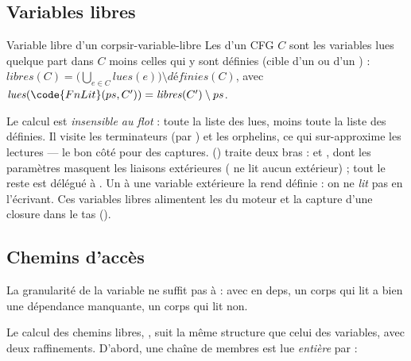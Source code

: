 \subsection{Variables libres}

\begin{definition}{Variable libre d'un corps}{ir-variable-libre}
Les  d'un CFG $C$ sont les variables lues quelque part dans $C$ moins celles qui y sont définies (cible d'un  ou d'un ) : $\mathit{libres}(C) = \bigl(\bigcup_{e \in C} \mathit{lues}(e)\bigr) \setminus \mathit{définies}(C)$, avec $\mathit{lues}(\code{FnLit}(ps, C')) = \mathit{libres}(C') \setminus ps$.
\end{definition}


Le calcul est \emph{insensible au flot} : toute la liste des lues, moins toute la liste des définies. Il visite les terminateurs (par ) et les orphelins, ce qui sur-approxime les lectures --- le bon côté pour des captures.  () traite deux bras :  et , dont les paramètres masquent les liaisons extérieures ( ne lit aucun  extérieur) ; tout le reste est délégué à . Un  à une variable extérieure la rend \og définie\fg{} : on ne \emph{lit} pas  en l'écrivant. Ces variables libres alimentent les  du moteur et la capture d'une closure dans le tas ().

\subsection{Chemins d'accès}

La granularité de la variable ne suffit pas à  : avec \code{[x.b]} en deps, un corps qui lit  a bien une dépendance manquante, un corps qui lit  non.


Le calcul des chemins libres, , suit la même structure que celui des variables, avec deux raffinements. D'abord, une chaîne de membres est lue \emph{entière} par  :


